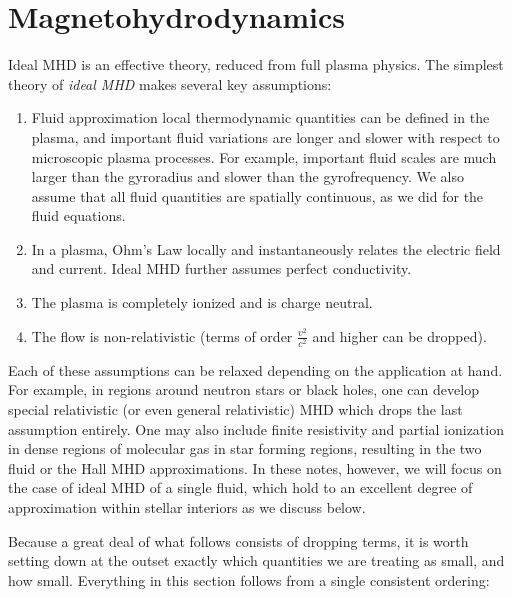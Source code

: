 \documentclass[notoc]{tufte-handout}
\begin{document}
\vfill\eject


\section{Magnetohydrodynamics}
Ideal MHD is an effective theory, reduced from full plasma physics. The simplest theory of {\it ideal MHD} makes several key assumptions:
\begin{enumerate}
    \item Fluid approximation \textemdash local thermodynamic quantities can be defined in the plasma, and important fluid variations are longer and slower with respect to microscopic plasma processes. For example, important fluid scales are much larger than the gyroradius and slower than the gyrofrequency. We also assume that all fluid quantities are spatially continuous, as we did for the fluid equations.

    \item In a plasma, Ohm's Law locally and instantaneously relates the electric field and current. Ideal MHD further assumes perfect conductivity.

    \item The plasma is completely ionized and is charge neutral.

    \item The flow is non-relativistic (terms of order $\frac{v^2}{c^2}$ and higher can be dropped).
\end{enumerate}
%
Each of these assumptions can be relaxed depending on the application at hand. For example, in regions around neutron stars or black holes, one can develop special relativistic (or even general relativistic) MHD which drops the last assumption entirely. One may also include finite resistivity and  partial ionization in dense regions of molecular gas in star forming regions, resulting in the two fluid or the Hall MHD approximations. In these notes, however, we will focus on the case of  ideal MHD of a single fluid, which hold to an excellent degree of approximation within stellar interiors as we discuss below.

Because a great deal of what follows consists of dropping terms, it is worth setting down at the outset exactly which quantities we are treating as small, and how small. Everything in this section follows from a single consistent ordering:
\end{document}

